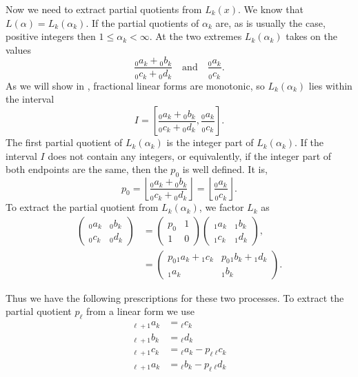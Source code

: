 Now we need to extract partial quotients from $L_k(x)$.  We know that
$L(\alpha) = L_k(\alpha_k)$.  If the partial quotients of $\alpha_k$
are, as is usually the case, positive integers then $1 \le \alpha_k <
\infty$.  At the two extremes $L_k(\alpha_k)$ takes on the values
\[
\frac{{}_0a_k + {}_0b_k}{{}_0c_k + {}_0d_k} \quad\mbox{and}\quad
\frac{{}_0a_k}{{}_0c_k}.
\]
As we will show in , fractional linear
forms are monotonic, so $L_k(\alpha_k)$ lies within the interval 
\[
I = \left[\frac{{}_0a_k + {}_0b_k}{{}_0c_k + {}_0d_k},
\frac{{}_0a_k}{{}_0c_k}\right].
\]
The first partial quotient of $L_k(\alpha_k)$ is the integer
part of $L_k(\alpha_k)$.  If the interval $I$ does not contain any
integers, or equivalently, if the integer part of both endpoints are
the same, then the $p_0$ is well defined. It is, 
\[
p_0 = \left\lfloor \frac{{}_0a_k + {}_0b_k}{{}_0c_k + {}_0d_k}\right\rfloor
    = \left\lfloor \frac{{}_0a_k}{{}_0c_k} \right\rfloor.
\]
To extract the partial quotient from $L_k(\alpha_k)$, we factor $L_k$
as
\[
\begin{aligned}
\begin{pmatrix}{}_0a_k&{}_0b_k\\ {}_0c_k&{}_0d_k\end{pmatrix} & = 
\begin{pmatrix}p_0&1\\ 1&0\end{pmatrix}
\begin{pmatrix}{}_1a_k&{}_1b_k\\ {}_1c_k&{}_1d_k\end{pmatrix}, \\
& = \begin{pmatrix}p_0 {}_1a_k + {}_1c_k & p_0 {}_1b_k + {}_1d_k \\
      {}_1a_k & {}_1b_k \end{pmatrix}.
\end{aligned}
\]

Thus we have the following prescriptions for these two processes.  To
extract the partial quotient $p_{\ell}$ from a linear form we use
\begin{equation}\label{CF:One:Extract:Eq}
\begin {aligned}
  {}_{\ell+1}a_k & = {}_{\ell}c_k \\
  {}_{\ell+1}b_k & = {}_{\ell}d_k \\
  {}_{\ell+1}c_k & = {}_{\ell}a_k - p_{\ell} \,{}_{\ell}c_k\\
  {}_{\ell+1}a_k & = {}_{\ell}b_k - p_{\ell} \,{}_{\ell}d_k
\end{aligned}
\end{equation}

